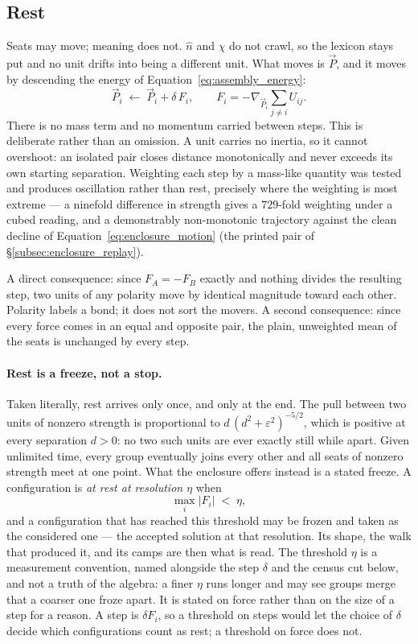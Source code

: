 \documentclass[12pt, a4paper]{article}
\begin{document}
\subsection{Rest}
\label{subsec:enclosure_rest}
Seats may move; meaning does not. $\hat n$ and $\chi$ do not crawl,
so the lexicon stays put and no unit drifts into being a different
unit. What moves is $\vec P$, and it moves by descending the energy
of Equation~\eqref{eq:assembly_energy}:
\begin{equation}
    \vec P_i \;\leftarrow\; \vec P_i + \delta\,F_i,
    \qquad
    F_i = -\nabla_{\vec P_i}\!\!\sum_{j\ne i} U_{ij}.
    \label{eq:enclosure_motion}
\end{equation}
There is no mass term and no momentum carried between steps. This
is deliberate rather than an omission. A unit carries no inertia, so
it cannot overshoot: an isolated pair closes distance monotonically
and never exceeds its own starting separation. Weighting each step
by a mass-like quantity was tested and produces oscillation rather
than rest, precisely where the weighting is most extreme --- a
ninefold difference in strength gives a $729$-fold weighting under a
cubed reading, and a demonstrably non-monotonic trajectory against
the clean decline of Equation~\eqref{eq:enclosure_motion}
(the printed pair of \S\ref{subsec:enclosure_replay}).

A direct consequence: since $F_A=-F_B$ exactly and nothing divides
the resulting step, two units of any polarity move by identical
magnitude toward each other. Polarity labels a bond; it does not
sort the movers. A second consequence: since every force comes in an
equal and opposite pair, the plain, unweighted mean of the seats is unchanged by every step.

\paragraph{Rest is a freeze, not a stop.}
Taken literally, rest arrives only once, and only at the end. The
pull between two units of nonzero strength is proportional to
$d\,(d^2+\varepsilon^2)^{-5/2}$, which is positive at every
separation $d>0$: no two such units are ever exactly still while
apart. Given unlimited time, every group eventually joins every
other and all seats of nonzero strength meet at one point. What the enclosure offers
instead is a stated freeze. A configuration is \emph{at rest at
resolution $\eta$} when
\begin{equation}
    \max_i \lvert F_i \rvert \;<\; \eta,
    \label{eq:enclosure_freeze}
\end{equation}
and a configuration that has reached this threshold may be frozen and
taken as the considered one --- the accepted solution at that
resolution. Its shape, the walk that produced it, and its camps are
then what is read. The threshold $\eta$ is a measurement convention,
named alongside the step $\delta$ and the census cut below, and not a
truth of the algebra: a finer $\eta$ runs longer and may see groups
merge that a coarser one froze apart. It is stated on force rather
than on the size of a step for a reason. A step is $\delta F_i$, so a
threshold on steps would let the choice of $\delta$ decide which
configurations count as rest; a threshold on force does not.
\end{document}
